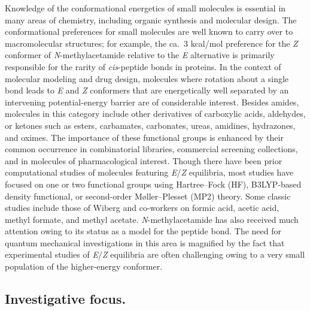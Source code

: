 \documentclass[12pt]{report}
\begin{document}
Knowledge of the conformational energetics of small molecules is essential in many areas of chemistry, including organic synthesis and molecular design.\cite{brameld} The conformational preferences for small molecules are well known to carry over to macromolecular structures; for example, the ca.\ 3 kcal/mol preference for the \textit{Z} conformer of \textit{N}-methylacetamide relative to the \textit{E} alternative is primarily responsible for the rarity of \textit{cis}-peptide bonds in proteins.\cite{jabs} In the context of molecular modeling and drug design, molecules where rotation about a single bond leads to \textit{E} and \textit{Z} conformers that are energetically well separated by an intervening potential-energy barrier are of considerable interest. Besides amides, molecules in this category include other derivatives of carboxylic acids, aldehydes, or ketones such as esters, carbamates, carbonates, ureas, amidines, hydrazones, and oximes. The importance of these functional groups is enhanced by their common occurrence in combinatorial libraries, commercial screening collections, and in molecules of pharmacological interest. Though there have been prior computational studies of molecules featuring \textit{E}/\textit{Z} equilibria, most studies have focused on one or two functional groups using Hartree--Fock (HF), B3LYP-based density functional, or second-order M\o ller--Plesset (MP2) theory.\cite{wibergez,gao,remko,glaser,stang,wibergez2,ev,deer,sun,strassner,murphy,chambers,cs,vill,kang,sen,koby,zhong,bry,bry2,mantz} Some classic studies include those of Wiberg and co-workers on formic acid, acetic acid, methyl formate, and methyl acetate.\cite{wibergez} \textit{N}-methylacetamide has also received much attention owing to its status as a model for the peptide bond.\cite{gao,murphy,vill,kang,mantz} The need for quantum mechanical investigations in this area is magnified by the fact that experimental studies of \textit{E}/\textit{Z} equilibria are often challenging owing to a very small population of the higher-energy conformer.


\subsection{Investigative focus.}
\end{document}
